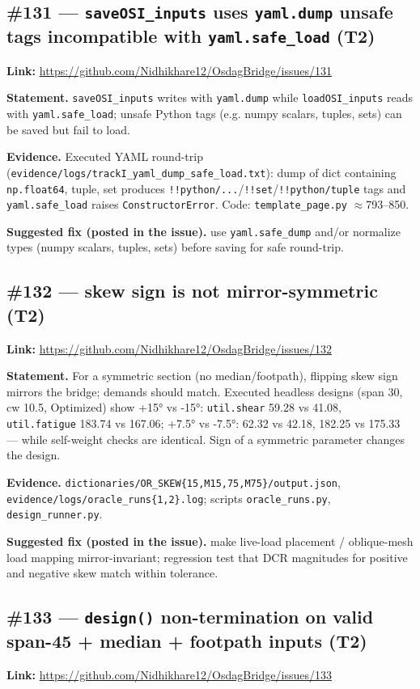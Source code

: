 \subsection{\#131 --- \texttt{saveOSI\_inputs} uses \texttt{yaml.dump} unsafe tags incompatible with \texttt{yaml.safe\_load} (T2)}
\textbf{Link:} \url{https://github.com/Nidhikhare12/OsdagBridge/issues/131}

\textbf{Statement.} \texttt{saveOSI\_inputs} writes with \texttt{yaml.dump} while \texttt{loadOSI\_inputs} reads with \texttt{yaml.safe\_load}; unsafe Python tags (e.g. numpy scalars, tuples, sets) can be saved but fail to load.

\textbf{Evidence.} Executed YAML round-trip (\texttt{evidence/logs/trackI\_yaml\_dump\_safe\_load.txt}): dump of dict containing \texttt{np.float64}, tuple, set produces \texttt{!!python/...}/\texttt{!!set}/\texttt{!!python/tuple} tags and \texttt{yaml.safe\_load} raises \texttt{ConstructorError}. Code: \texttt{template\_page.py} $\approx$793--850.

\textbf{Suggested fix (posted in the issue).} use \texttt{yaml.safe\_dump} and/or normalize types (numpy scalars, tuples, sets) before saving for safe round-trip.

\subsection{\#132 --- skew sign is not mirror-symmetric (T2)}
\textbf{Link:} \url{https://github.com/Nidhikhare12/OsdagBridge/issues/132}

\textbf{Statement.} For a symmetric section (no median/footpath), flipping skew sign mirrors the bridge; demands should match. Executed headless designs (span 30, cw 10.5, Optimized) show +15° vs -15°: \texttt{util.shear} 59.28 vs 41.08, \texttt{util.fatigue} 183.74 vs 167.06; +7.5° vs -7.5°: 62.32 vs 42.18, 182.25 vs 175.33 — while self-weight checks are identical. Sign of a symmetric parameter changes the design.

\textbf{Evidence.} \texttt{dictionaries/OR\_SKEW\{15,M15,75,M75\}/output.json}, \texttt{evidence/logs/oracle\_runs\{1,2\}.log}; scripts \texttt{oracle\_runs.py}, \texttt{design\_runner.py}.

\textbf{Suggested fix (posted in the issue).} make live-load placement / oblique-mesh load mapping mirror-invariant; regression test that DCR magnitudes for positive and negative skew match within tolerance.

\subsection{\#133 --- \texttt{design()} non-termination on valid span-45 + median + footpath inputs (T2)}
\textbf{Link:} \url{https://github.com/Nidhikhare12/OsdagBridge/issues/133}

